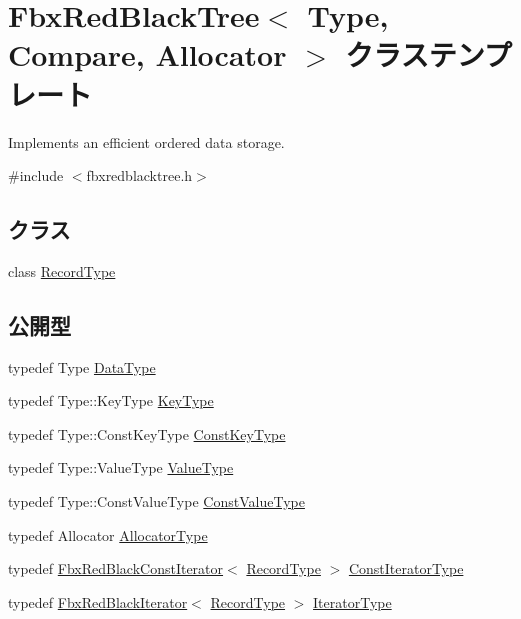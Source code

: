 \hypertarget{class_fbx_red_black_tree}{}\section{Fbx\+Red\+Black\+Tree$<$ Type, Compare, Allocator $>$ クラステンプレート}
\label{class_fbx_red_black_tree}


Implements an efficient ordered data storage.  




{\ttfamily \#include $<$fbxredblacktree.\+h$>$}

\subsection*{クラス}
\begin{DoxyCompactItemize}
\item 
class \hyperlink{class_fbx_red_black_tree_1_1_record_type}{Record\+Type}
\end{DoxyCompactItemize}
\subsection*{公開型}
\begin{DoxyCompactItemize}
\item 
typedef Type \hyperlink{class_fbx_red_black_tree_a9bd3feb4c82e7d105bc475f01a9a199d}{Data\+Type}
\item 
typedef Type\+::\+Key\+Type \hyperlink{class_fbx_red_black_tree_a241b31c6972995417d193458b7bb27e2}{Key\+Type}
\item 
typedef Type\+::\+Const\+Key\+Type \hyperlink{class_fbx_red_black_tree_ad0aa82c0fd952b04edb550fc1fb36a32}{Const\+Key\+Type}
\item 
typedef Type\+::\+Value\+Type \hyperlink{class_fbx_red_black_tree_a178e34888fa8c0fab5a7527ab30a663c}{Value\+Type}
\item 
typedef Type\+::\+Const\+Value\+Type \hyperlink{class_fbx_red_black_tree_a60ce913af196ee4cf886585363c4b0ca}{Const\+Value\+Type}
\item 
typedef Allocator \hyperlink{class_fbx_red_black_tree_a62c49ab2e7d602aac98a9413e490ca90}{Allocator\+Type}
\item 
typedef \hyperlink{class_fbx_red_black_const_iterator}{Fbx\+Red\+Black\+Const\+Iterator}$<$ \hyperlink{class_fbx_red_black_tree_1_1_record_type}{Record\+Type} $>$ \hyperlink{class_fbx_red_black_tree_a7309ae5e1bb24e7e3da94fef975d10c4}{Const\+Iterator\+Type}
\item 
typedef \hyperlink{class_fbx_red_black_iterator}{Fbx\+Red\+Black\+Iterator}$<$ \hyperlink{class_fbx_red_black_tree_1_1_record_type}{Record\+Type} $>$ \hyperlink{class_fbx_red_black_tree_af7b6209131012ec5aa33e0286c956cd6}{Iterator\+Type}
\end{DoxyCompactItemize}
